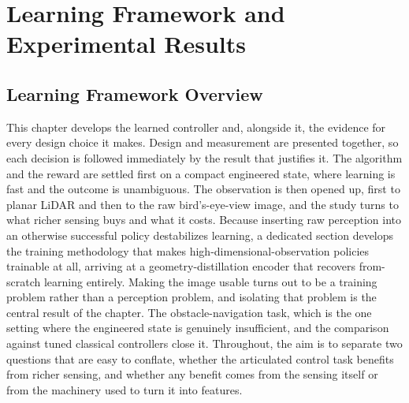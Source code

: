 %
%

\chapter{Learning Framework and Experimental Results}
\label{ch:learning_framework}
\label{ch:results}

\providecommand{\pending}[1]{\textcolor{red}{[pending: #1]}}

\section{Learning Framework Overview}

This chapter develops the learned controller and, alongside it, the evidence for every design choice it makes. Design and measurement are presented together, so each decision is followed immediately by the result that justifies it. The algorithm and the reward are settled first on a compact engineered state, where learning is fast and the outcome is unambiguous. The observation is then opened up, first to planar LiDAR and then to the raw bird's-eye-view image, and the study turns to what richer sensing buys and what it costs. Because inserting raw perception into an otherwise successful policy destabilizes learning, a dedicated section develops the training methodology that makes high-dimensional-observation policies trainable at all, arriving at a geometry-distillation encoder that recovers from-scratch learning entirely. Making the image usable turns out to be a training problem rather than a perception problem, and isolating that problem is the central result of the chapter. The obstacle-navigation task, which is the one setting where the engineered state is genuinely insufficient, and the comparison against tuned classical controllers close it. Throughout, the aim is to separate two questions that are easy to conflate, whether the articulated control task benefits from richer sensing, and whether any benefit comes from the sensing itself or from the machinery used to turn it into features.

